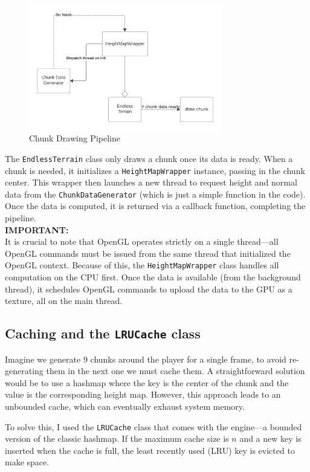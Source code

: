 \begin{figure}[H]
    \centering
    \includegraphics[width=0.75\textwidth]{images/chunk_process.png}
    \caption{Chunk Drawing Pipeline}
    \label{fig:chunk_pipeline}
\end{figure}

The \texttt{EndlessTerrain} class only draws a chunk once its data is ready. When a chunk is needed, it initializes a \texttt{HeightMapWrapper} instance, passing in the chunk center. This wrapper then launches a new thread to request height and normal data from the \texttt{ChunkDataGenerator} (which is just a simple function in the code). Once the data is computed, it is returned via a callback function, completing the pipeline.
\\
\textbf{\large IMPORTANT:}\\
It is crucial to note that OpenGL operates strictly on a single thread—all OpenGL commands must be issued from the same thread that initialized the OpenGL context. Because of this, the \texttt{HeightMapWrapper} class handles all computation on the CPU first. Once the data is available (from the background thread), it schedules OpenGL commands to upload the data to the GPU as a texture, all on the main thread.

\subsection{Caching and the \texttt{LRUCache} class}
Imagine we generate 9 chunks around the player for a single frame, to avoid re-generating them in the next one we must cache them. A straightforward solution would be to use a hashmap where the key is the center of the chunk and the value is the corresponding height map. However, this approach leads to an unbounded cache, which can eventually exhaust system memory.

To solve this, I used the \texttt{LRUCache} class that comes with the engine—a bounded version of the classic hashmap. If the maximum cache size is $n$ and a new key is inserted when the cache is full, the least recently used (LRU) key is evicted to make space.

